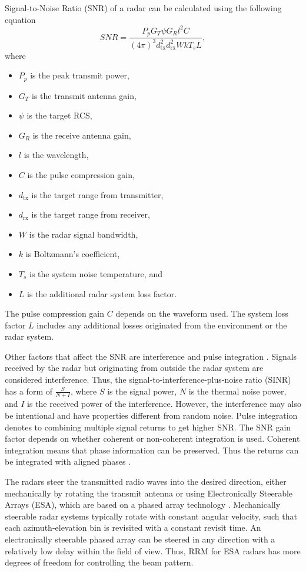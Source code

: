 \documentclass[english, 12pt, a4paper, elec, utf8, a-1b, online]{aaltothesis}
\begin{document}
Signal-to-Noise Ratio (SNR) of a radar can be calculated using the following equation \cite{Curry2011}
\begin{equation} \label{eq:radar_snr}
SNR = \frac{P_p G_T \psi G_R l^2 C}{(4\pi)^3 d_\text{tx}^2 d_\text{rx}^2 W k T_s L},
\end{equation}
where
\begin{itemize}
    \item $P_p$ is the peak transmit power,
    \item $G_T$ is the transmit antenna gain,
    \item $\psi$ is the target RCS,
    \item $G_R$ is the receive antenna gain,
    \item $l$ is the wavelength,
    \item $C$ is the pulse compression gain,
    \item $d_\text{tx}$ is the target range from transmitter,
    \item $d_\text{rx}$ is the target range from receiver,
    \item $W$ is the radar signal bandwidth,
    \item $k$ is Boltzmann's coefficient,
    \item $T_s$ is the system noise temperature, and 
    \item $L$ is the additional radar system loss factor.
\end{itemize}
The pulse compression gain $C$ depends on the waveform used.
The system loss factor $L$ includes any additional losses originated from the environment or the radar system.

Other factors that affect the SNR are interference and pulse integration \cite{Curry2011}.
Signals received by the radar but originating from outside the radar system are considered interference.
Thus, the signal-to-interference-plus-noise ratio (SINR) has a form of $\frac{S}{N+I}$, where
$S$ is the signal power,
$N$ is the thermal noise power, and
$I$ is the received power of the interference.
However, the interference may also be intentional and have properties different from random noise. 
Pulse integration denotes to combining multiple signal returns to get higher SNR.
The SNR gain factor depends on whether coherent or non-coherent integration is used.
Coherent integration means that phase information can be preserved. 
Thus the returns can be integrated with aligned phases \cite{Curry2011}.

The radars steer the transmitted radio waves into the desired direction, either mechanically by rotating the transmit antenna \cite{Curry2011} or using Electronically Steerable Arrays (ESA), which are based on a phased array technology \cite{Mailloux2017}.
Mechanically steerable radar systems typically rotate with constant angular velocity, such that each azimuth-elevation bin is revisited with a constant revisit time.
An electronically steerable phased array can be steered in any direction with a relatively low delay within the field of view.
Thus, RRM for ESA radars has more degrees of freedom for controlling the beam pattern.
\end{document}
